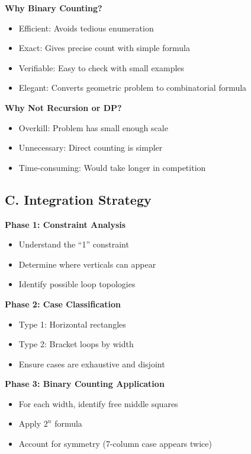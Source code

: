 \documentclass[12pt]{article}
\begin{document}
\begin{techniquesbox}
\textbf{Why Binary Counting?}
\begin{itemize}
    \item Efficient: Avoids tedious enumeration
    \item Exact: Gives precise count with simple formula
    \item Verifiable: Easy to check with small examples
    \item Elegant: Converts geometric problem to combinatorial formula
\end{itemize}

\textbf{Why Not Recursion or DP?}
\begin{itemize}
    \item Overkill: Problem has small enough scale
    \item Unnecessary: Direct counting is simpler
    \item Time-consuming: Would take longer in competition
\end{itemize}

\subsection*{C. Integration Strategy}

\textbf{Phase 1: Constraint Analysis}
\begin{itemize}
    \item Understand the ``1'' constraint
    \item Determine where verticals can appear
    \item Identify possible loop topologies
\end{itemize}

\textbf{Phase 2: Case Classification}
\begin{itemize}
    \item Type 1: Horizontal rectangles
    \item Type 2: Bracket loops by width
    \item Ensure cases are exhaustive and disjoint
\end{itemize}

\textbf{Phase 3: Binary Counting Application}
\begin{itemize}
    \item For each width, identify free middle squares
    \item Apply $2^n$ formula
    \item Account for symmetry (7-column case appears twice)
\end{itemize}


\end{techniquesbox}
\end{document}
